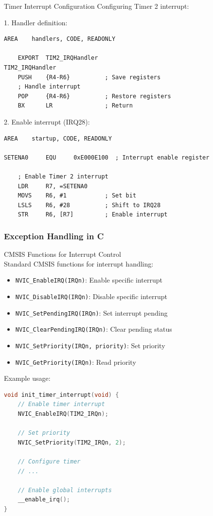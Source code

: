 \begin{example2}{Timer Interrupt Configuration}
Configuring Timer 2 interrupt:

1. Handler definition:
\begin{lstlisting}[language=armasm, style=basesmol]
    AREA    handlers, CODE, READONLY
    
    EXPORT  TIM2_IRQHandler
TIM2_IRQHandler
    PUSH    {R4-R6}          ; Save registers
    ; Handle interrupt
    POP     {R4-R6}          ; Restore registers
    BX      LR               ; Return
\end{lstlisting}

2. Enable interrupt (IRQ28):
\begin{lstlisting}[language=armasm, style=basesmol]
    AREA    startup, CODE, READONLY
    
SETENA0     EQU     0xE000E100  ; Interrupt enable register
    
    ; Enable Timer 2 interrupt
    LDR     R7, =SETENA0
    MOVS    R6, #1           ; Set bit
    LSLS    R6, #28          ; Shift to IRQ28
    STR     R6, [R7]         ; Enable interrupt
\end{lstlisting}
\end{example2}


\columnbreak

\subsubsection{Exception Handling in C}

\begin{KR}{CMSIS Functions for Interrupt Control}\\
Standard CMSIS functions for interrupt handling:
\begin{itemize}
  \item \texttt{NVIC\_EnableIRQ(IRQn)}: Enable specific interrupt
  \item \texttt{NVIC\_DisableIRQ(IRQn)}: Disable specific interrupt
  \item \texttt{NVIC\_SetPendingIRQ(IRQn)}: Set interrupt pending
  \item \texttt{NVIC\_ClearPendingIRQ(IRQn)}: Clear pending status
  \item \texttt{NVIC\_SetPriority(IRQn, priority)}: Set priority
  \item \texttt{NVIC\_GetPriority(IRQn)}: Read priority
\end{itemize}

Example usage:
\begin{lstlisting}[language=C, style=basesmol]
void init_timer_interrupt(void) {
    // Enable timer interrupt
    NVIC_EnableIRQ(TIM2_IRQn);
    
    // Set priority
    NVIC_SetPriority(TIM2_IRQn, 2);
    
    // Configure timer
    // ...
    
    // Enable global interrupts
    __enable_irq();
}
\end{lstlisting}
\end{KR}


